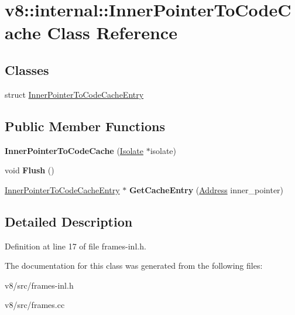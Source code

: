 \hypertarget{classv8_1_1internal_1_1InnerPointerToCodeCache}{}\section{v8\+:\+:internal\+:\+:Inner\+Pointer\+To\+Code\+Cache Class Reference}
\label{classv8_1_1internal_1_1InnerPointerToCodeCache}
\subsection*{Classes}
\begin{DoxyCompactItemize}
\item 
struct \mbox{\hyperlink{structv8_1_1internal_1_1InnerPointerToCodeCache_1_1InnerPointerToCodeCacheEntry}{Inner\+Pointer\+To\+Code\+Cache\+Entry}}
\end{DoxyCompactItemize}
\subsection*{Public Member Functions}
\begin{DoxyCompactItemize}
\item 
\mbox{\label{classv8_1_1internal_1_1InnerPointerToCodeCache_aa5648205deaf18119d17308276caa507}} 
{\bfseries Inner\+Pointer\+To\+Code\+Cache} (\mbox{\hyperlink{classv8_1_1internal_1_1Isolate}{Isolate}} $\ast$isolate)
\item 
\mbox{\label{classv8_1_1internal_1_1InnerPointerToCodeCache_a9a529de6174a47e94e76191e20e59830}} 
void {\bfseries Flush} ()
\item 
\mbox{\label{classv8_1_1internal_1_1InnerPointerToCodeCache_a99ae60417d91f2a5504b40bfc55acc57}} 
\mbox{\hyperlink{structv8_1_1internal_1_1InnerPointerToCodeCache_1_1InnerPointerToCodeCacheEntry}{Inner\+Pointer\+To\+Code\+Cache\+Entry}} $\ast$ {\bfseries Get\+Cache\+Entry} (\mbox{\hyperlink{classuintptr__t}{Address}} inner\+\_\+pointer)
\end{DoxyCompactItemize}


\subsection{Detailed Description}


Definition at line 17 of file frames-\/inl.\+h.



The documentation for this class was generated from the following files\+:\begin{DoxyCompactItemize}
\item 
v8/src/frames-\/inl.\+h\item 
v8/src/frames.\+cc\end{DoxyCompactItemize}
